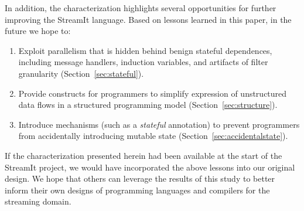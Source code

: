 In addition, the characterization highlights several opportunities for
further improving the StreamIt language.  Based on lessons learned in
this paper, in the future we hope to:

\begin{enumerate}

\item Exploit parallelism that is hidden behind benign stateful
  dependences, including message handlers, induction variables, and
  artifacts of filter granularity (Section~\ref{sec:stateful}).

\item Provide constructs for programmers to simplify expression of
  unstructured data flows in a structured programming model
  (Section~\ref{sec:structure}).

\item Introduce mechanisms (such as a {\it stateful} annotation) to
  prevent programmers from accidentally introducing mutable state
  (Section~\ref{sec:accidentalstate}).

\end{enumerate}

If the characterization presented herein had been available at the
start of the StreamIt project, we would have incorporated the above
lessons into our original design.  We hope that others can leverage
the results of this study to better inform their own designs of
programming languages and compilers for the streaming domain.
